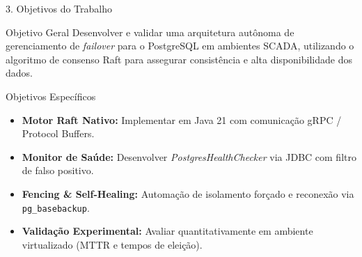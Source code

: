 \documentclass[aspectratio=169,10pt]{beamer}
\begin{document}
\begin{frame}{3. Objetivos do Trabalho}
  \begin{block}{Objetivo Geral}
    Desenvolver e validar uma arquitetura autônoma de gerenciamento de \textit{failover} para o PostgreSQL em ambientes SCADA, utilizando o algoritmo de consenso Raft para assegurar consistência e alta disponibilidade dos dados.
  \end{block}
  \vspace{0.5em}
  \begin{exampleblock}{Objetivos Específicos}
    \begin{itemize}
      \item \textbf{Motor Raft Nativo:} Implementar em Java 21 com comunicação gRPC / Protocol Buffers.
      \item \textbf{Monitor de Saúde:} Desenvolver \textit{PostgresHealthChecker} via JDBC com filtro de falso positivo.
      \item \textbf{Fencing \& Self-Healing:} Automação de isolamento forçado e reconexão via \texttt{pg\_basebackup}.
      \item \textbf{Validação Experimental:} Avaliar quantitativamente em ambiente virtualizado (MTTR e tempos de eleição).
    \end{itemize}
  \end{exampleblock}
\end{frame}
\end{document}
